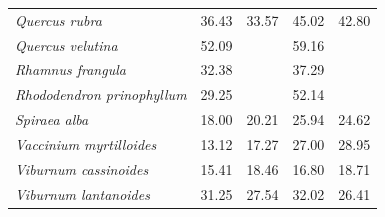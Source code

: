 \documentclass{article}
\begin{document}
\begin{table}[ht]
\begin{tabular}{lrrrr}
  \textit{Quercus rubra} & 36.43 & 33.57 & 45.02 & 42.80 \\ 
  \textit{Quercus velutina} & 52.09 &  & 59.16 &  \\ 
  \textit{Rhamnus frangula} & 32.38 &  & 37.29 &  \\ 
  \textit{Rhododendron prinophyllum} & 29.25 &  & 52.14 &  \\ 
  \textit{Spiraea alba} & 18.00 & 20.21 & 25.94 & 24.62 \\ 
  \textit{Vaccinium myrtilloides} & 13.12 & 17.27 & 27.00 & 28.95 \\ 
  \textit{Viburnum cassinoides} & 15.41 & 18.46 & 16.80 & 18.71 \\ 
  \textit{Viburnum lantanoides} & 31.25 & 27.54 & 32.02 & 26.41 \\ 
   \hline
\end{tabular}
\end{table}
\end{document}
